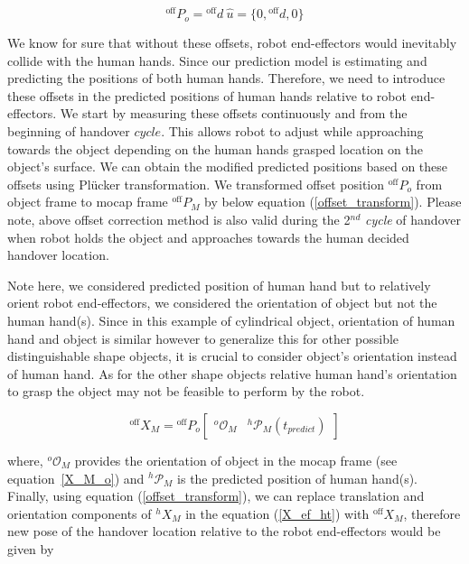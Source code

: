 \begin{equation}
	{}^\text{off}{P}_{o} = {}^\text{off}{d} \: \hat{u}  =  \{0, {}^\text{off}{d}, 0\}
\end{equation}


We know for sure that without these offsets, robot end-effectors would inevitably collide with the human hands. Since our prediction model is estimating and predicting the positions of both human hands. Therefore, we need to introduce these offsets in the predicted positions of human hands relative to robot end-effectors. We start by measuring these offsets continuously and from the beginning of handover $\textit{cycle}$. This allows robot to adjust while approaching towards the object depending on the human hands grasped location on the object's surface. We can obtain the modified predicted positions based on these offsets using Pl\"ucker transformation. We transformed offset position ${}^\text{off}{P}_{o}$ from object frame to mocap frame ${}^\text{off}{P}_{M}$ by below equation (\ref{offset_transform}). Please note, above offset correction method is also valid during the 2$^{nd}$ \textit{cycle} of handover when robot holds the object and approaches towards the human decided handover location.


Note here, we considered predicted position of human hand but to relatively orient robot end-effectors, we considered the orientation of object but not the human hand(s). Since in this example of cylindrical object, orientation of human hand and object is similar however to generalize this for other possible distinguishable shape objects, it is crucial to consider object's orientation instead of human hand. As for the other shape objects relative human hand's orientation to grasp the object may not be feasible to perform by the robot. 


\begin{equation}\label{offset_transform}
{}^\text{off}{X}_{M} = 
{}^\text{off}{P}_{o}
 \left[\begin{array}{cc}
{}^{o}\mathcal{O}_M & {}^{h}\mathcal{P}_M(t_{predict})
\end{array}\right]
\end{equation}


where, ${}^{o}\mathcal{O}_M$ provides the orientation of object in the mocap frame (see equation~\ref{X_M_o}) and ${}^{h}\mathcal{P}_M$ is the predicted position of human hand(s). Finally, using equation (\ref{offset_transform}), we can replace translation and orientation components of ${}^{h}{X}_M$ in the equation (\ref{X_ef_ht}) with ${}^\text{off}{X}_{M}$, therefore new pose of the handover location relative to the robot end-effectors would be given by

